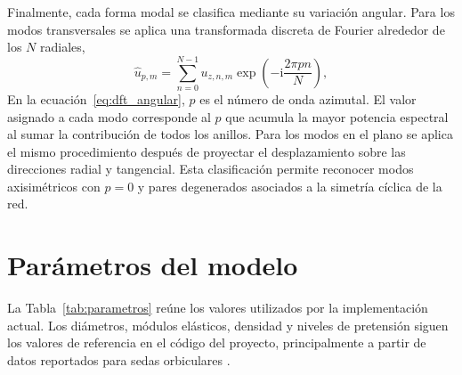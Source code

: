 \documentclass[11pt,letterpaper]{article}
\begin{document}
Finalmente, cada forma modal se clasifica mediante su variación angular. Para los modos transversales se aplica una transformada discreta de Fourier alrededor de los $N$ radiales,
\begin{equation}
\widehat{u}_{p,m}=\sum_{n=0}^{N-1}u_{z,n,m}
\exp\left(-\mathrm{i}\frac{2\pi pn}{N}\right),
\label{eq:dft_angular}
\end{equation}
En la ecuación~\eqref{eq:dft_angular}, $p$ es el número de onda azimutal. El valor asignado a cada modo corresponde al $p$ que acumula la mayor potencia espectral al sumar la contribución de todos los anillos. Para los modos en el plano se aplica el mismo procedimiento después de proyectar el desplazamiento sobre las direcciones radial y tangencial. Esta clasificación permite reconocer modos axisimétricos con $p=0$ y pares degenerados asociados a la simetría cíclica de la red.

\section{Parámetros del modelo}

La Tabla~\ref{tab:parametros} reúne los valores utilizados por la implementación actual. Los diámetros, módulos elásticos, densidad y niveles de pretensión siguen los valores de referencia en el código del proyecto, principalmente a partir de datos reportados para sedas orbiculares \cite{yavuz2024,stauffer1994,gosline1999}. 
\end{document}
